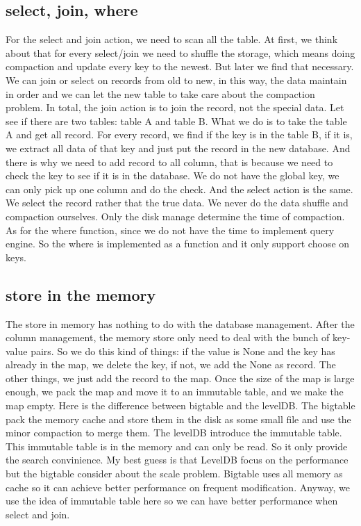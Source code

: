 \documentclass[a4paper]{article}
\begin{document}
\subsection{select, join, where}
For the select and join action, we need to scan all the table. At first, we think about that for every select/join we need to shuffle the storage, which means doing compaction and update every key to the newest. But later we find that necessary. We can join or select on records from old to new, in this way, the data maintain in order and we can let the new table to take care about the  compaction problem. In total, the join action is to join the record, not the special data. Let see if there are two tables: table A and table B. What we do is to take the table A and get all record. For every record, we find if the key is in the table B, if it is, we extract all data of that key and just put the record in the new database. And there is why we need to add record to all column, that is because we need to check the key to see if it is in the database. We do not have the global key, we can only pick up one column and do the check. And the select action is the same. We select the record rather that the true data. We never do the data shuffle and compaction ourselves. Only the disk manage determine the time of compaction. As for the where function, since we do not have the time to implement query engine. So the where is implemented as a function and it only support choose on keys.
\subsection{store in the memory}
The store in memory has nothing to do with the database management. After the column management, the memory store only need to deal with the bunch of key-value pairs. So we do this kind of things: if the value is None and the key has already in the map, we delete the key, if not, we add the None as record. The other things, we just add the record to the map. Once the size of the map is large enough, we pack the map and move it to an immutable table, and we make the map empty. Here is the difference between bigtable and the levelDB. The bigtable pack the memory cache and store them in the disk as some small file and use the minor compaction to merge them. The levelDB introduce the immutable table. This immutable table is in the memory and can only be read. So it only provide the search convinience. My best guess is that LevelDB focus on the performance but the bigtable consider about the scale problem. Bigtable uses all memory as cache so it can achieve better performance on frequent modification. Anyway, we use the idea of immutable table here so we can have better performance when select and join.
\end{document}
